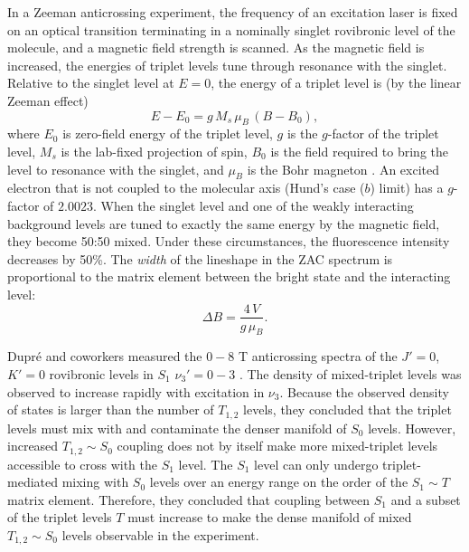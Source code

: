 In a Zeeman anticrossing experiment, the frequency of an excitation
laser is fixed on an optical transition terminating in a nominally
singlet rovibronic level of the molecule, and a magnetic field
strength is scanned.  As the magnetic field is increased, the energies
of triplet levels tune through resonance with the singlet.  Relative
to the singlet level at $E=0$, the energy of a triplet level is
(by the linear Zeeman effect)
\begin{equation}
  E - E_0 = g \, M_s \, \mu_B \, (B-B_0),
\end{equation}
where $E_0$ is zero-field energy of the triplet level, $g$ is the
$g$-factor of the triplet level, $M_s$ is the lab-fixed projection of
spin, $B_0$ is the field required to bring the level to resonance with
the singlet, and $\mu_B$ is the Bohr magneton \cite{lombardi88}.  An
excited electron that is not coupled to the molecular axis (Hund's
case ($b$) limit) has a $g$-factor of $2.0023$.  When the singlet
level and one of the weakly interacting background levels are tuned to
exactly the same energy by the magnetic field, they become 50:50
mixed.  Under these circumstances, %
the fluorescence intensity decreases by 50\%.  The \emph{width} of the
lineshape in the ZAC spectrum is proportional to the matrix element
between the bright state and the interacting level:
\begin{equation}
  \Delta B = \frac{4\,V}{g\,\mu_B}.
\end{equation}

Dupr\'{e} and coworkers measured the $0-8$ T anticrossing spectra of
the $J'=0$, $K'=0$ rovibronic levels in $S_1$ $\nu_3'=0-3$
\cite{dupre91}.  The density of mixed-triplet levels was observed to
increase rapidly with excitation in $\nu_3$.  Because the observed
density of states is larger than the number of $T_{1,2}$ levels, they
concluded that the triplet levels must mix with and contaminate the
denser manifold of $S_0$ levels.  However, increased $T_{1,2} \sim
S_0$ coupling does not by itself make more mixed-triplet levels
accessible to cross with the $S_1$ level.  The $S_1$ level can only
undergo triplet-mediated mixing with $S_0$ levels over an energy range
on the order of the $S_1 \sim T$ matrix element.  Therefore, they
concluded that coupling between $S_1$ and a subset of the triplet
levels $T$ must increase to make the dense manifold of mixed $T_{1,2}
\sim S_0$ levels observable in the experiment.

